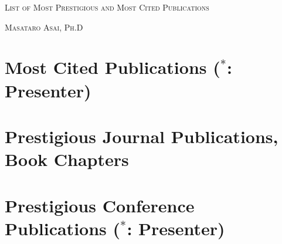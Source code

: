 \documentclass[letterpaper,11pt]{article}
\begin{document}
\pagestyle{empty}

\begin{center}
{\huge\textsc{List of Most Prestigious and Most Cited Publications}}
\vspace{0.7\baselineskip}

{\Large\textsc{Masataro Asai, Ph.D}}
\vspace{0.5\baselineskip}

\small

\end{center}

\section{Most Cited Publications ($^*$: Presenter)}

\nocite{Asai2018}
\putbib

\section{Prestigious Journal Publications, Book Chapters}

\nocite{Asai2022}
\nocite{Asai2017}
\putbib

\section{Prestigious Conference Publications ($^*$: Presenter)}

\nocite{Asai2022b}
\nocite{Asai2022c}
\nocite{Asai2020}
\nocite{Asai2019a}
\nocite{Asai2019b}
\nocite{Asai2018}
\nocite{Asai2017e}
\nocite{Asai2017b}
\nocite{Asai2016b}
\nocite{Asai2016}
\nocite{Asai2015}
\nocite{Asai2014}
\putbib
\end{document}
